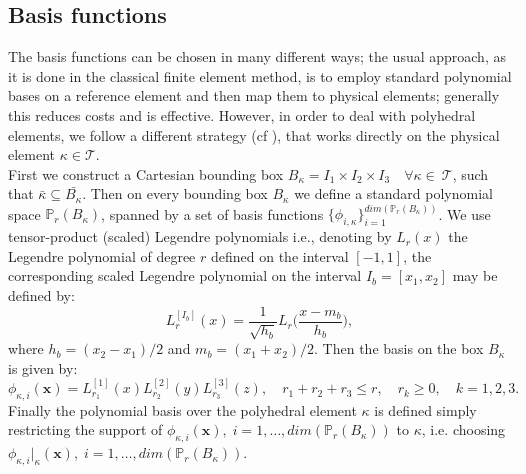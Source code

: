 \documentclass[12pt, a4paper]{article}
\theoremstyle{definition}
\theoremstyle{plain}
\theoremstyle{plain}
\theoremstyle{definition}
\begin{document}
\subsection{Basis functions} \label{subsec:basis}
The basis functions can be chosen in many different ways; the usual approach, 
as it is done in the classical finite element method, is to employ standard 
polynomial bases on a reference element and then map them to physical elements; 
generally this reduces costs and is effective. However, in order to deal with 
polyhedral elements, we follow a different strategy (cf \cite{hpmet}), that 
works directly on the physical element $\kappa \in \mathcal{T}$.\\
First we 
construct a Cartesian bounding box $B_\kappa=I_1\times I_2 \times 
I_3 \quad \forall\kappa\in~\mathcal{T} $, such that $\bar{\kappa} \subseteq 
\bar{B_\kappa}$. Then on every bounding box $B_\kappa$ we define a standard 
polynomial space $\mathbb{P}_r(B_\kappa)$, spanned by a set of basis functions 
$\{ \phi_{i,\kappa} \}_{i=1}^{dim(\mathbb{P}_r(B_\kappa))}$. We use 
tensor-product (scaled) Legendre polynomials i.e., denoting by $L_r(x)$ the 
Legendre polynomial of degree $r$ defined on the interval $[-1, 1]$, the 
corresponding scaled Legendre polynomial on the interval $I_b = [x_1, x_2]$ may 
be defined by:
\begin{equation*}
	L_r^{[I_b]} (x) = \frac{1}{\sqrt{h_b}} L_r \bigg( \frac{x-m_b}{h_b} \bigg),
\end{equation*}
where $h_b = (x_2-x_1)/2$ and $m_b = (x_1+x_2)/2$. Then the basis on the box 
$B_\kappa$ is given by:
\begin{equation*}
\phi_{\kappa,i}(\mathbf{x}) = L_{r_1}^{[1]}(x)L_{r_2}^{[2]}(y)L_{r_3}^{[3]}(z), \quad
r_1+r_2+r_3 \leq r, \quad r_k \geq 0, \quad k = 1,2,3.
\end{equation*}
Finally the polynomial basis over the polyhedral element $\kappa$ is defined simply restricting the support of $\phi_{\kappa, i}(\mathbf{x}), \; i=1,\dots,dim(\mathbb{P}_r(B_\kappa))$ to $\kappa$, i.e. choosing  $\phi_{\kappa, i}|_\kappa (\mathbf{x}), \; i=1,\dots,dim(\mathbb{P}_r(B_\kappa))$.
\end{document}
